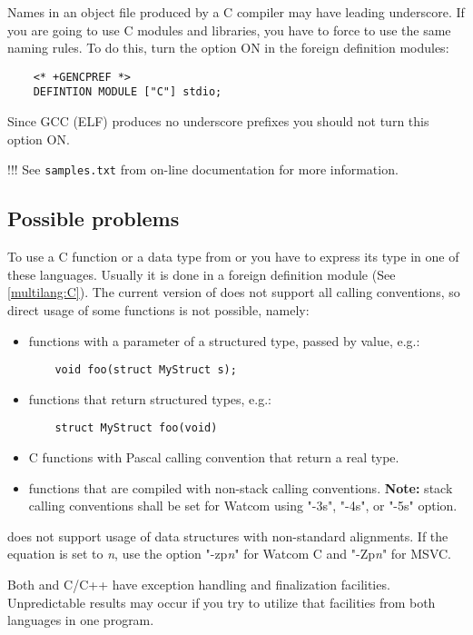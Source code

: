 Names in an object file produced by a C compiler may have leading
underscore. If you are going to use C modules and libraries, you have to
force \XDS{} to use the same naming rules. To do this, turn the
 option ON in the foreign definition modules:

\verb'    <* +GENCPREF *>' \\
\verb'    DEFINTION MODULE ["C"] stdio;'

\iflinux
Since GCC (ELF) produces no underscore prefixes you should not turn this option
ON.
\fi

\ifcomment !!!
See {\tt samples.txt} from \XDS{} on-line documentation for more
information.
\fi

\subsection{Possible problems}

To use a C function or a data type from \mt{} or \ot{} you have
to express its type in one of these languages. Usually
it is done in a foreign definition module (See \ref{multilang:C}).
The current version of \XDS{} does not support
all calling conventions, so direct usage of some functions
is not possible, namely:
\begin{itemize}
\item functions with a parameter of a structured type, passed by value,
      e.g.:

\verb'    void foo(struct MyStruct s);'

\item functions that return structured types, e.g.:

\verb'    struct MyStruct foo(void)'

\item C functions with Pascal calling convention that return
      a real type.

\iflinux \else %
\item functions that are compiled with non-stack calling conventions.
      {\bf Note:} stack calling conventions shall be set for
      Watcom using "-3s", "-4s", or "-5s" option.
\fi
\end{itemize}

\iflinux \else %
  \XDS{} does not support usage of data structures with
  non-standard alignments. If the  equation is set
  to {\em n}, use the option "-zp{\em n}" for Watcom C and
  "-Zp{\em n}" for MSVC.
\fi

Both \mt{} and C/C++ have exception handling and finalization
facilities.  Unpredictable results may occur
if you try to utilize that facilities from both languages in one program.

